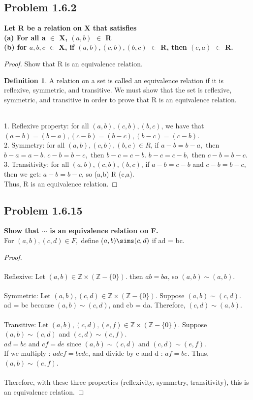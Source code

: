 \documentclass[12pt]{article}
\theoremstyle{definition}
\newtheorem{definition}[theorem]{Definition}
\numberwithin{equation}{subsection}
\begin{document}
\subsection{Problem 1.6.2}
\textbf{Let R be a relation on X that satisfies \\ (a) For all a $\in$ X, $(a, b)$ $\in$ R \\ (b) for $a, b, c$ $\in$ X, if $(a,b),(c,b),(b,c)$ $\in$ R, then $(c,a)$ $\in$ R.}
\begin{proof} Show that R is an equivalence relation.
\begin{definition}
A relation on a set is called an equivalence relation if it is reflexive, symmetric, and transitive.
We must show that the set is reflexive, symmetric, and transitive in order to prove that R is an equivalence relation. 
\end{definition} \\ 1. Reflexive property: for all $(a,b),(c,b),(b,c)$, we have that $(a-b) = (b-a), (c-b) = (b-c), (b-c)=(c-b)$.
\\ 2. Symmetry: for all $(a,b),(c,b),(b,c) \in R$, if $a-b = b-a,$ then $b-a = a-b.$ $c-b = b-c,$ then $b-c = c-b.$ $b-c = c-b,$ then $c-b = b-c.$
\\ 3. Transitivity: for all $(a,b),(c,b),(b,c)$, if $a-b=c-b$ and $c-b=b-c,$ then we get:
$a-b = b-c$, so (a,b) R (c,a).\\
Thus, R is an equivalence relation.
\end{proof}
\subsection{Problem 1.6.15}
\textbf{Show that $\sim$ is an equivalence relation on F.} \\
For $(a,b),(c,d) \in F,$ define ($a,b) \sims (c,d)$ if ad = bc.
\begin{proof}\\\\
Reflexive: Let $(a,b) \in \mathbb{Z} \times (\mathbb{Z} - \{0\}).$ 
then $ab = ba$, so $(a,b) \sim (a,b).$ \\\\
Symmetric: Let $(a,b),(c,d) \in \mathbb{Z} \times (\mathbb{Z} - \{0\}).$  Suppose $(a,b) \sim (c,d)$. 
\\
ad = bc because $(a,b) \sim (c,d)$, and cb = da. Therefore, $(c,d) \sim (a,b).$ 
\\\\
Transitive: Let $(a,b),(c,d),(e,f) \in \mathbb{Z} \times (\mathbb{Z} - \{0\}).$ Suppose $(a,b) \sim (c,d)$ and $(c,d) \sim (e,f).$ 
\\
$ad = bc$ and $cf = de$ since $(a,b) \sim (c,d)$ and $(c,d) \sim (e,f).$
\\ If we multiply : $adcf = bcde$, and divide by c and d : $af = be.$ Thus, $(a, b) \sim (e,f)$. \\\\
Therefore, with these three properties (reflexivity, symmetry, transitivity), this is an equivalence relation.


\end{proof}
\end{document}
